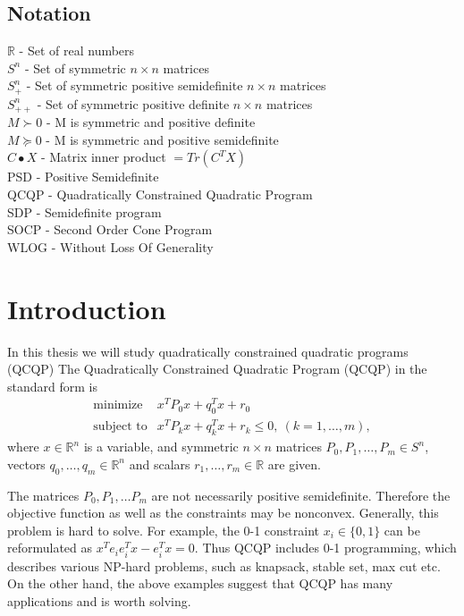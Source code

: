 \documentclass[10pt,oneside]{book}
\author{Matúš Stehlík}
\theoremstyle{definition}
\begin{document}
\section*{Notation}

$\mathbb{R}$ - Set of real numbers \\
$S^n$ - Set of symmetric $n\times n$ matrices \\
$S^n_+$ - Set of symmetric positive semidefinite $n\times n$ matrices \\
$S^n_{++}$ - Set of symmetric positive definite $n\times n$ matrices \\
$M\succ 0$ - M is symmetric and positive definite \\
$M\succeq 0$ - M is symmetric and positive semidefinite \\
$C\bullet X$ - Matrix inner product $=Tr(C^TX)$\\

PSD - Positive Semidefinite \\

QCQP - Quadratically Constrained Quadratic Program \\
SDP - Semidefinite program \\
SOCP - Second Order Cone Program \\

WLOG - Without Loss Of Generality

\chapter{Introduction}

In this thesis we will study quadratically constrained quadratic programs (QCQP)
\label{defQCQP}
The Quadratically Constrained Quadratic Program (QCQP) in the standard form is
\begin{equation}
\label{qcqp} 
\begin{array}{ll}
\mbox{minimize}& x^TP_0x + q_0^Tx +r_0 \\
\mbox{subject to}& x^TP_kx + q_k^Tx + r_k \leq 0, \  (k = 1,\dots ,m),
\end{array} 
\end{equation}
where $x\in \mathbb{R}^n$ is a variable, and symmetric $n\times n$ matrices $P_0, P_1, \dots ,P_m \in S^n$, vectors $q_0,\dots ,q_m \in \mathbb{R}^n$ and scalars $r_1,\dots ,r_m\in \mathbb{R}$ are given.

The matrices $P_0, P_1, \dots P_m$ are not necessarily positive semidefinite. Therefore the objective function as well as the constraints may be nonconvex. Generally, this problem is hard to solve. For example, the 0-1 constraint $x_i\in \{0,1\}$ can be reformulated as $x^Te_ie_i^Tx - e_i^Tx =0$. Thus QCQP includes 0-1 programming, which describes various NP-hard problems, such as knapsack, stable set, max cut etc. 
On the other hand, the above examples suggest that QCQP has many applications and is worth solving.
\end{document}
